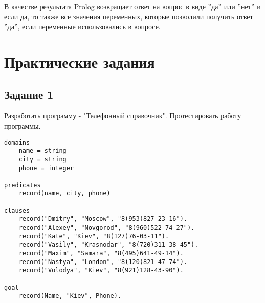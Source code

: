 В качестве результата Prolog возвращает ответ на вопрос в виде ''да'' или ''нет'' и если да, то также все значения переменных, которые позволили получить ответ ''да'', если переменные использовались в вопросе.\\


\chapter{Практические задания}
\section*{Задание 1}
Разработать программу - "Телефонный справочник". Протестировать работу программы.

\begin{lstlisting}
domains
	name = string
	city = string
	phone = integer

predicates
  	record(name, city, phone)
  
clauses
	record("Dmitry", "Moscow", "8(953)827-23-16").
	record("Alexey", "Novgorod", "8(960)522-74-27").
	record("Kate", "Kiev", "8(127)76-03-11").
	record("Vasily", "Krasnodar", "8(720)311-38-45").
	record("Maxim", "Samara", "8(495)641-49-14").
	record("Nastya", "London", "8(120)821-47-74").
	record("Volodya", "Kiev", "8(921)128-43-90").

goal
	record(Name, "Kiev", Phone).
\end{lstlisting}